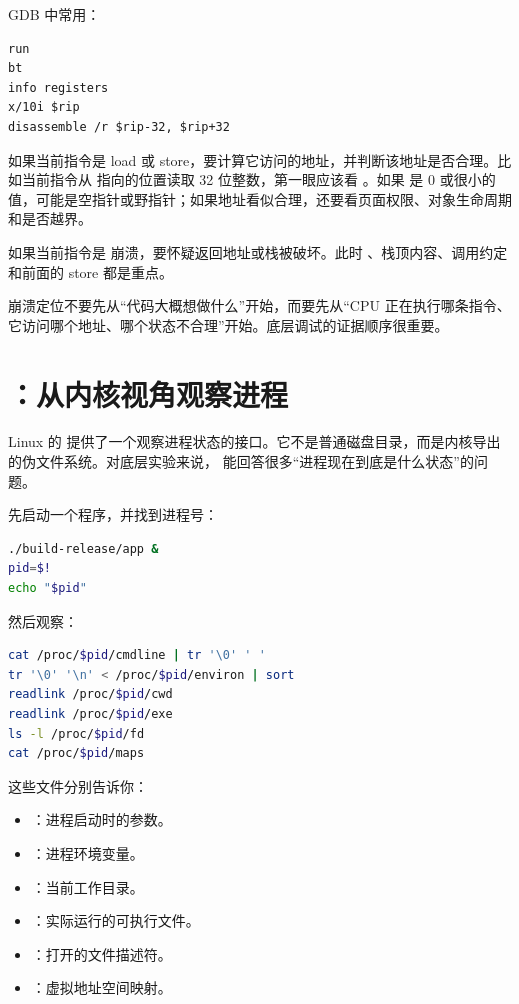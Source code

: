 GDB 中常用：

\begin{lstlisting}
run
bt
info registers
x/10i $rip
disassemble /r $rip-32, $rip+32
\end{lstlisting}

如果当前指令是 load 或 store，要计算它访问的地址，并判断该地址是否合理。比如当前指令从  指向的位置读取 32 位整数，第一眼应该看 。如果  是 0 或很小的值，可能是空指针或野指针；如果地址看似合理，还要看页面权限、对象生命周期和是否越界。

如果当前指令是  崩溃，要怀疑返回地址或栈被破坏。此时 、栈顶内容、调用约定和前面的 store 都是重点。

\begin{warningbox}
崩溃定位不要先从“代码大概想做什么”开始，而要先从“CPU 正在执行哪条指令、它访问哪个地址、哪个状态不合理”开始。底层调试的证据顺序很重要。
\end{warningbox}

\section{：从内核视角观察进程}

Linux 的  提供了一个观察进程状态的接口。它不是普通磁盘目录，而是内核导出的伪文件系统。对底层实验来说， 能回答很多“进程现在到底是什么状态”的问题。

先启动一个程序，并找到进程号：

\begin{lstlisting}[language=bash]
./build-release/app &
pid=$!
echo "$pid"
\end{lstlisting}

然后观察：

\begin{lstlisting}[language=bash]
cat /proc/$pid/cmdline | tr '\0' ' '
tr '\0' '\n' < /proc/$pid/environ | sort
readlink /proc/$pid/cwd
readlink /proc/$pid/exe
ls -l /proc/$pid/fd
cat /proc/$pid/maps
\end{lstlisting}

这些文件分别告诉你：

\begin{itemize}
  \item {}：进程启动时的参数。
  \item {}：进程环境变量。
  \item {}：当前工作目录。
  \item {}：实际运行的可执行文件。
  \item {}：打开的文件描述符。
  \item {}：虚拟地址空间映射。
\end{itemize}

